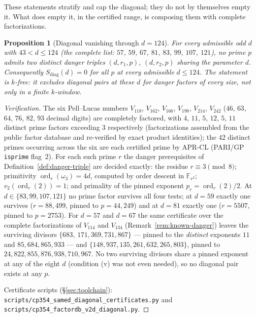 \documentclass[11pt]{amsart}
\theoremstyle{plain}
\newtheorem{proposition}[theorem]{Proposition}
\theoremstyle{definition}
\theoremstyle{remark}
\numberwithin{equation}{section}
\newcommand{\ord}{\operatorname{ord}}
\newcommand{\F}{\mathbb{F}}
\begin{document}
These statements stratify and cap the diagonal; they do not by themselves empty it. What does empty it, in the certified range, is composing them with complete factorizations.

\begin{proposition}[Diagonal vanishing through $d = 124$]\label{prop:diagonal-closures}
For every admissible odd $d$ with $43 < d \leq 124$ (the complete list: $57$, $59$, $67$, $81$, $83$, $99$, $107$, $121$), no prime $p$ admits two distinct danger triples $(d, r_1, p)$, $(d, r_2, p)$ sharing the parameter $d$. Consequently $S_{\mathrm{diag}}(d) = 0$ for all $p$ at every admissible $d \leq 124$. The statement is $k$-free: it excludes diagonal pairs at these $d$ for danger factors of every size, not only in a finite $k$-window.
\end{proposition}

\begin{proof}[Verification]
The six Pell--Lucas numbers $V_{118}$, $V_{162}$, $V_{166}$, $V_{198}$, $V_{214}$, $V_{242}$ ($46$, $63$, $64$, $76$, $82$, $93$ decimal digits) are completely factored, with $4$, $11$, $5$, $12$, $5$, $11$ distinct prime factors exceeding $3$ respectively (factorizations assembled from the public factor database \cite{ref:FactorDB} and re-verified by exact product identities); the $42$ distinct primes occurring across the six are each certified prime by APR-CL (PARI/GP \texttt{isprime} flag~$2$). For each such prime $r$ the danger prerequisites of Definition~\ref{def:danger-triple} are decided exactly: the residue $r \equiv 3 \pmod 8$; primitivity $\ord_r(\omega_3) = 4 d$, computed by order descent in $\F_{r^2}$; $v_2(\ord_r(2)) = 1$; and primality of the pinned exponent $p_r = \ord_r(2)/2$. At $d \in \{83, 99, 107, 121\}$ no prime factor survives all four tests; at $d = 59$ exactly one survives ($r = 88{,}499$, pinned to $p = 44{,}249$) and at $d = 81$ exactly one ($r = 5507$, pinned to $p = 2753$). For $d = 57$ and $d = 67$ the same certificate over the complete factorizations of $V_{114}$ and $V_{134}$ (Remark~\ref{rem:known-danger}) leaves the surviving divisors $\{683,\ 171{,}369{,}731{,}867\}$ --- pinned to the \emph{distinct} exponents $11$ and $85{,}684{,}865{,}933$ --- and $\{148{,}937{,}135{,}261{,}632{,}265{,}803\}$, pinned to $24{,}822{,}855{,}876{,}938{,}710{,}967$. No two surviving divisors share a pinned exponent at any of the eight $d$ (condition (v) was not even needed), so no diagonal pair exists at any $p$.
{\sloppy
Certificate scripts (\S\ref{sec:toolchain}): \texttt{scripts/}\allowbreak\texttt{cp354\_samed\_}\allowbreak\texttt{diagonal\_}\allowbreak\texttt{certificates.py} and \texttt{scripts/}\allowbreak\texttt{cp354\_factordb\_}\allowbreak\texttt{v2d\_}\allowbreak\texttt{diagonal.py}.\par}
\end{proof}
\end{document}
